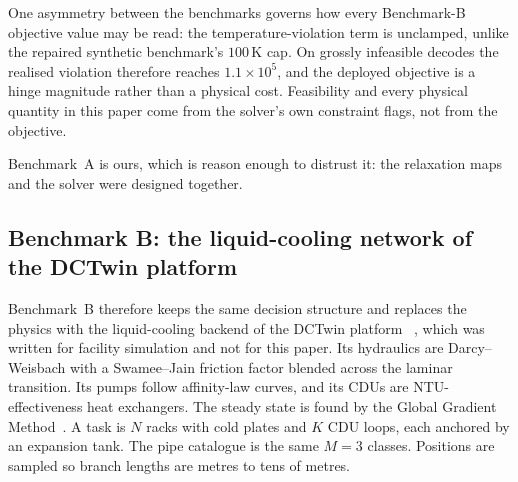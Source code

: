 \documentclass[journal]{IEEEtran}
\newif\ifblindreview
\newcommand{\platform}{\ifblindreview a production data-centre digital-twin platform\else the DCTwin platform\fi}
\begin{document}
One asymmetry between the benchmarks governs how every
Benchmark-B objective value may be read: the temperature-violation term is
unclamped, unlike the repaired synthetic benchmark's $100$\,K cap.  On grossly
infeasible decodes the realised violation therefore reaches $1.1\times10^{5}$, and
the deployed objective is a hinge magnitude rather than a physical cost.  Feasibility and every
physical quantity in this paper come from the solver's own constraint flags, not from
the objective.

Benchmark~A is ours, which is reason enough to distrust it: the relaxation maps and
the solver were designed together.  \subsection{Benchmark B: the liquid-cooling network of \platform}
\label{sec:benchB}
Benchmark~B therefore keeps the same decision
structure and replaces the physics with the liquid-cooling backend of \platform
~\cite{li2026dctwin}, which was written for facility simulation and not for
this paper.  Its hydraulics are Darcy--Weisbach with a Swamee--Jain friction factor blended
across the laminar transition.  Its pumps follow affinity-law curves, and its CDUs
are NTU-effectiveness heat exchangers.  The steady state is found by the Global Gradient
Method~\cite{todini1988gga}.  A task is $N$ racks with cold plates and $K$ CDU loops, each anchored by an
expansion tank.  The pipe catalogue is the same $M{=}3$ classes.  Positions are
sampled so branch lengths are metres to tens of metres.
\end{document}
